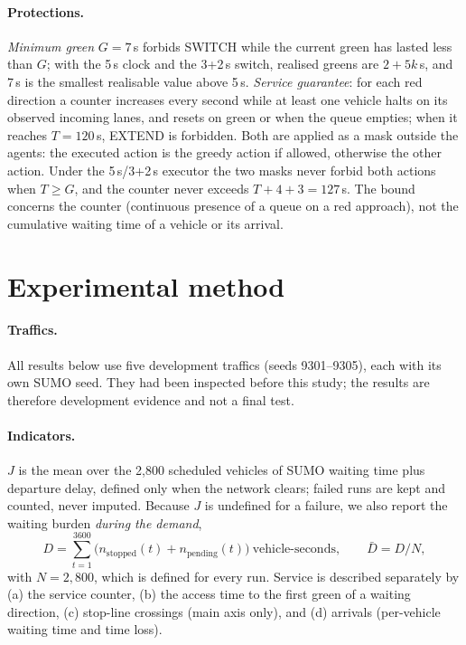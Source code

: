 \documentclass[11pt]{article}
\begin{document}
\paragraph{Protections.}
\emph{Minimum green} $G=7$\,s forbids SWITCH while the current green has lasted less than $G$; with the
5\,s clock and the 3+2\,s switch, realised greens are $2+5k$\,s, and 7\,s is the smallest realisable value
above 5\,s. \emph{Service guarantee}: for each red direction a counter increases every second while at least
one vehicle halts on its observed incoming lanes, and resets on green or when the queue empties; when it
reaches $T=120$\,s, EXTEND is forbidden. Both are applied as a mask outside the agents: the executed action
is the greedy action if allowed, otherwise the other action. Under the 5\,s/3+2\,s executor the two masks
never forbid both actions when $T\ge G$, and the counter never exceeds $T+4+3=127$\,s. The bound concerns
the counter (continuous presence of a queue on a red approach), not the cumulative waiting time of a vehicle
or its arrival.

\section{Experimental method}
\paragraph{Traffics.} All results below use five development traffics (seeds 9301--9305), each with its own
SUMO seed. They had been inspected before this study; the results are therefore development evidence and not
a final test.

\paragraph{Indicators.}
$J$ is the mean over the 2{,}800 scheduled vehicles of SUMO waiting time plus departure delay, defined only
when the network clears; failed runs are kept and counted, never imputed. Because $J$ is undefined for a
failure, we also report the waiting burden \emph{during the demand},
\[ D=\sum_{t=1}^{3600}\big(n_{\mathrm{stopped}}(t)+n_{\mathrm{pending}}(t)\big)\ \text{vehicle-seconds},\qquad \bar D = D/N, \]
with $N=2{,}800$, which is defined for every run. Service is described separately by (a) the service
counter, (b) the access time to the first green of a waiting direction, (c) stop-line crossings (main axis
only), and (d) arrivals (per-vehicle waiting time and time loss).
\end{document}
